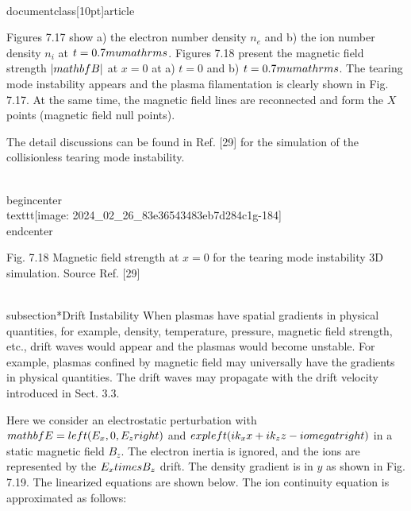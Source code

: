 \\documentclass[10pt]{article}
\begin{document}
{{{{Figures 7.17 show a) the electron number density $n_{e}$ and b) the ion number density $n_{i}$ at $t=0.7 \\mu \\mathrm{s}$. Figures 7.18 present the magnetic field strength $|\\mathbf{B}|$ at $x=0$ at a) $t=0$ and b) $t=0.7 \\mu \\mathrm{s}$. The tearing mode instability appears and the plasma filamentation is clearly shown in Fig. 7.17. At the same time, the magnetic field lines are reconnected and form the $X$ points (magnetic field null points).

The detail discussions can be found in Ref. [29] for the simulation of the collisionless tearing mode instability.

\\begin{center}
\\texttt{[image: 2024\_02\_26\_83e36543483eb7d284c1g-184]}
\\end{center}

Fig. 7.18 Magnetic field strength at $x=0$ for the tearing mode instability 3D simulation. Source Ref. [29]

\\subsection*{Drift Instability}
When plasmas have spatial gradients in physical quantities, for example, density, temperature, pressure, magnetic field strength, etc., drift waves would appear and the plasmas would become unstable. For example, plasmas confined by magnetic field may universally have the gradients in physical quantities. The drift waves may propagate with the drift velocity introduced in Sect. 3.3.

Here we consider an electrostatic perturbation with $\\mathbf{E}=\\left(E_{x}, 0, E_{z}\\right)$ and $\\exp \\left(i k_{x} x+i k_{z} z-i \\omega t\\right)$ in a static magnetic field $B_{z}$. The electron inertia is ignored, and the ions are represented by the $E_{x} \\times B_{z}$ drift. The density gradient is in $y$ as shown in Fig. 7.19. The linearized equations are shown below. The ion continuity equation is approximated as follows:


}}}}
\end{document}

